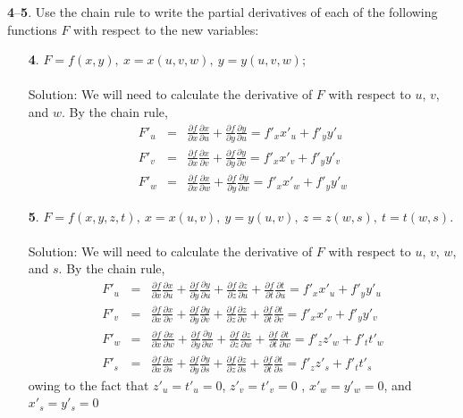 \documentclass[12pt]{amsbook}
\begin{document}
{\small {\bf 4}--{\bf 5}}. Use the chain rule to write the partial derivatives of each of the
following functions $F$ with respect to the new variables:
\begin{enumerate}
\item[{\small\bf 4}.] $F=f(x,y), \ x=x(u,v,w), \ y=y(u,v,w)$;
\\
\\
{\sc Solution}: We will need to calculate the derivative of $F$ with respect to $u$, $v$, and $w$. By the chain rule,
\begin{eqnarray*}
F'_u&=&\frac{\partial f}{\partial x}\frac{\partial x}{\partial u}+\frac{\partial f}{\partial y}\frac{\partial y}{\partial u}=f'_xx'_u+f'_yy'_u\\
F'_v&=&\frac{\partial f}{\partial x}\frac{\partial x}{\partial v}+\frac{\partial f}{\partial y}\frac{\partial y}{\partial v}=f'_xx'_v+f'_yy'_v\\
F'_w&=&\frac{\partial f}{\partial x}\frac{\partial x}{\partial w}+\frac{\partial f}{\partial y}\frac{\partial y}{\partial w}=f'_xx'_w+f'_yy'_w
\end{eqnarray*}
\item[{\small\bf 5}.] $F=f(x,y,z,t), \ x=x(u,v), \ y=y(u,v), \ z=z(w,s), \ t=t(w,s)$.
\\
\\
{\sc Solution}: We will need to calculate the derivative of $F$ with respect to $u$, $v$, $w$, and $s$. By the chain rule,
\begin{eqnarray*}
F'_u&=&\frac{\partial f}{\partial x}\frac{\partial x}{\partial u}+\frac{\partial f}{\partial y}\frac{\partial y}{\partial u}+\frac{\partial f}{\partial z}\frac{\partial z}{\partial u}+\frac{\partial f}{\partial t}\frac{\partial t}{\partial u}=f'_xx'_u+f'_yy'_u\\
F'_v&=&\frac{\partial f}{\partial x}\frac{\partial x}{\partial v}+\frac{\partial f}{\partial y}\frac{\partial y}{\partial v}+\frac{\partial f}{\partial z}\frac{\partial z}{\partial v}+\frac{\partial f}{\partial t}\frac{\partial t}{\partial v}=f'_xx'_v+f'_yy'_v\\
F'_w&=&\frac{\partial f}{\partial x}\frac{\partial x}{\partial w}+\frac{\partial f}{\partial y}\frac{\partial y}{\partial w}+\frac{\partial f}{\partial z}\frac{\partial z}{\partial w}+\frac{\partial f}{\partial t}\frac{\partial t}{\partial w}=f'_zz'_w+f'_tt'_w \\
F'_s&=&\frac{\partial f}{\partial x}\frac{\partial x}{\partial s}+\frac{\partial f}{\partial y}\frac{\partial y}{\partial s}+\frac{\partial f}{\partial z}\frac{\partial z}{\partial s}+\frac{\partial f}{\partial t}\frac{\partial t}{\partial s}=f'_zz'_s+f'_tt'_s
\end{eqnarray*}
owing to the fact that $z'_u=t'_u=0$, $z'_v=t'_v=0$ , $x'_w=y'_w=0$, and $x'_s=y'_s=0$
\end{enumerate}
\end{document}
